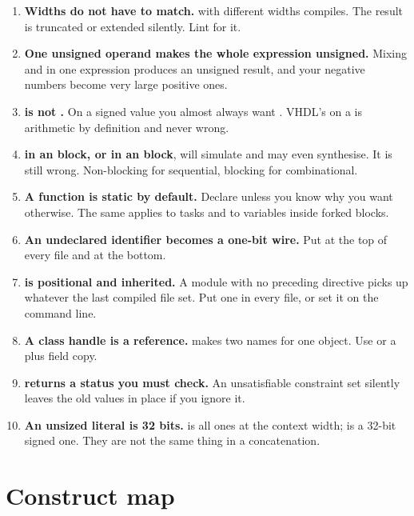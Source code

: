 \begin{enumerate}
  \item \textbf{Widths do not have to match.}  with different
        widths compiles. The result is truncated or extended silently. Lint
        for it.
  \item \textbf{One unsigned operand makes the whole expression unsigned.}
        Mixing  and  in one expression
        produces an unsigned result, and your negative numbers become very
        large positive ones.
  \item \textbf{\code{>>} is not \code{>>>}.} On a signed value you almost
        always want \code{>>>}. VHDL's  on a
         is arithmetic by definition and never wrong.
  \item \textbf{\code{<=} in an  block, or \code{=} in an
         block}, will simulate and may even synthesise. It
        is still wrong. Non-blocking for sequential, blocking for
        combinational.
  \item \textbf{A function is static by default.} Declare
         unless you know why you want otherwise.
        The same applies to tasks and to variables inside forked blocks.
  \item \textbf{An undeclared identifier becomes a one-bit wire.} Put
         at the top of every file and
         at the bottom.
  \item \textbf{ is positional and inherited.} A module
        with no preceding directive picks up whatever the last compiled file
        set. Put one in every file, or set it on the command line.
  \item \textbf{A class handle is a reference.}  makes two names
        for one object. Use  or a  plus field copy.
  \item \textbf{ returns a status you must check.} An
        unsatisfiable constraint set silently leaves the old values in place
        if you ignore it.
  \item \textbf{An unsized literal is 32 bits.}  is all ones at the
        context width;  is a 32-bit signed one. They are not the
        same thing in a concatenation.
\end{enumerate}

\section{Construct map}

